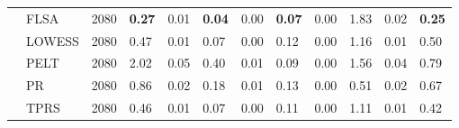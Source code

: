 \begin{table}[ht]
\begin{tabular}{llrlrlrlrlrl}
   & FLSA & 2080 & \textbf{0.27} & 0.01 & \textbf{0.04} & 0.00 & \textbf{0.07} & 0.00 & 1.83 & 0.02 & \textbf{0.25} \\ 
   & LOWESS & 2080 & 0.47 & 0.01 & 0.07 & 0.00 & 0.12 & 0.00 & 1.16 & 0.01 & 0.50 \\ 
   & PELT & 2080 & 2.02 & 0.05 & 0.40 & 0.01 & 0.09 & 0.00 & 1.56 & 0.04 & 0.79 \\ 
   & PR & 2080 & 0.86 & 0.02 & 0.18 & 0.01 & 0.13 & 0.00 & 0.51 & 0.02 & 0.67 \\ 
   & TPRS & 2080 & 0.46 & 0.01 & 0.07 & 0.00 & 0.11 & 0.00 & 1.11 & 0.01 & 0.42 \\ 
   \bottomrule
\end{tabular}
\end{table}
